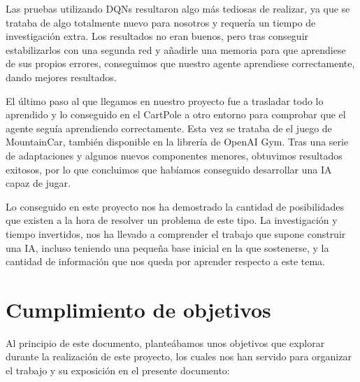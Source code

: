 Las pruebas utilizando DQNs resultaron algo más tediosas de realizar, ya que se trataba de algo totalmente nuevo para nosotros y requería un tiempo de investigación extra. Los resultados no eran buenos, pero tras conseguir estabilizarlos con una segunda red y añadirle una memoria para que aprendiese de sus propios errores, conseguimos que nuestro agente aprendiese correctamente, dando mejores resultados.

El último paso al que llegamos en nuestro proyecto fue a trasladar todo lo aprendido y lo conseguido en el CartPole a otro entorno para comprobar que el agente seguía aprendiendo correctamente. Esta vez se trataba de el juego de MountainCar, también disponible en la librería de OpenAI Gym. Tras una serie de adaptaciones y algunos nuevos componentes menores, obtuvimos resultados exitosos, por lo que concluimos que habíamos conseguido desarrollar una IA capaz de jugar. 

Lo conseguido en este proyecto nos ha demostrado la cantidad de posibilidades que existen a la hora de resolver un problema de este tipo. La investigación y tiempo invertidos, nos ha llevado a comprender el trabajo que supone construir una IA, incluso teniendo una pequeña base inicial en la que sostenerse, y la cantidad de información que nos queda por aprender respecto a este tema.  

\section{Cumplimiento de objetivos}

Al principio de este documento, planteábamos unos objetivos que explorar durante la realización de este proyecto, los cuales nos han servido para organizar el trabajo y su exposición en el presente documento:

